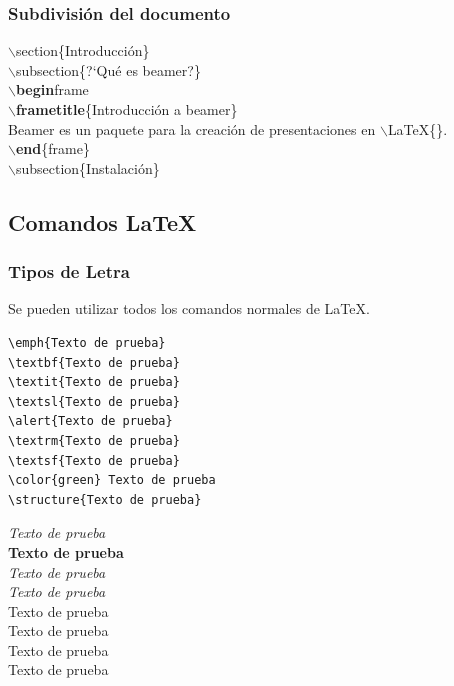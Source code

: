 \documentclass[aspectratio=43]{beamer}%
\newcommand\azul[1]{\textcolor[RGB]{19,15,204}{#1}}
\begin{document}
\begin{frame}[fragile]
\frametitle{\textbf{Subdivisión del documento}}
\justifying
 \begin{block}{}
$\backslash$\azul{section}\{Introducci\'on\}\\
$\backslash$\azul{subsection}\{?`Qu\'e es beamer?\}\\
$\backslash$\textbf{begin}{frame}\\
$\backslash$\textbf{frametitle}\{Introducci\'on a beamer\}\\
Beamer es un paquete para la creaci\'on de presentaciones en $\backslash$LaTeX\{\}.\\
$\backslash$\textbf{end}\{frame\}\\
$\backslash$\azul{subsection}\{Instalaci\'on\}
\end{block}

\end{frame}

\subsection{Comandos \LaTeX{}}
\begin{frame}[fragile]
\frametitle{\textbf{Tipos de Letra}}
\justifying
 Se pueden utilizar todos los comandos normales de \LaTeX{}.
 
 \begin{minipage}[l]{0.60\linewidth}
   \lstset{language=}%
   \vspace{-0.7cm}
\begin{lstlisting}
\emph{Texto de prueba}
\textbf{Texto de prueba}
\textit{Texto de prueba}
\textsl{Texto de prueba}
\alert{Texto de prueba}
\textrm{Texto de prueba}
\textsf{Texto de prueba}
\color{green} Texto de prueba
\structure{Texto de prueba}
\end{lstlisting}\vspace{-0.3cm}

\end{minipage}\hfill
\begin{minipage}[r]{0.38\linewidth}
\emph{Texto de prueba}\\
\textbf{Texto de prueba}\\
\textit{Texto de prueba}\\
\textsl{Texto de prueba}\\
\alert{Texto de prueba}\\
\textrm{Texto de prueba}\\
\textsf{Texto de prueba}\\
\color{green} Texto de prueba\\
\end{minipage}

 
\end{frame}
\end{document}
